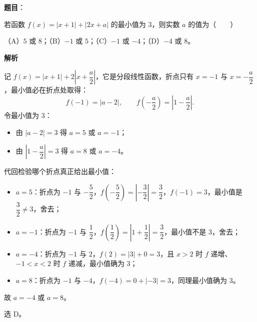 \begin{answer}

\textbf{题目}：

若函数 $f(x)=|x+1|+|2x+a|$ 的最小值为 $3$，则实数 $a$ 的值为\mbox{（　　）}

（A）$5$ 或 $8$；（B）$-1$ 或 $5$；（C）$-1$ 或 $-4$；（D）$-4$ 或 $8$。

\textbf{解析}

记 $f(x)=|x+1|+2\left|x+\dfrac a2\right|$，它是分段线性函数，折点只有 $x=-1$ 与 $x=-\dfrac a2$，最小值必在折点处取得：
\nopagebreak[4]
\[f(-1)=\left|a-2\right|,\qquad
f\left(-\frac a2\right)=\left|1-\frac a2\right| .\]
令最小值为 $3$：

\begin{itemize}
\item 由 $|a-2|=3$ 得 $a=5$ 或 $a=-1$；
\item 由 $\left|1-\dfrac a2\right|=3$ 得 $a=8$ 或 $a=-4$。
\end{itemize}

代回检验哪个折点真正给出最小值：

\begin{itemize}
\item $a=5$：折点为 $-1$ 与 $-\dfrac52$，$f\left(-\dfrac52\right)=\left|-\dfrac32\right|=\dfrac32$，$f(-1)=3$，最小值是 $\dfrac32\neq3$，舍去；
\item $a=-1$：折点为 $-1$ 与 $\dfrac12$，$f\left(\dfrac12\right)=\left|1+\dfrac12\right|=\dfrac32$，最小值不是 $3$，舍去；
\item $a=-4$：折点为 $-1$ 与 $2$，$f(2)=|3|+0=3$，且 $x>2$ 时 $f$ 递增、$-1<x<2$ 时 $f$ 递减，最小值确为 $3$；
\item $a=8$：折点为 $-1$ 与 $-4$，$f(-4)=0+|-3|=3$，同理最小值确为 $3$。
\end{itemize}

故 $a=-4$ 或 $a=8$。

选 D。


\end{answer}
